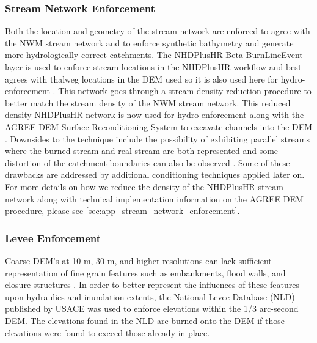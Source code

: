 \subsubsection{Stream Network Enforcement} 
\label{ssec:stream_network_enforcement}
%
Both the location and geometry of the stream network are enforced to agree with the NWM stream network and to enforce synthetic bathymetry and generate more hydrologically correct catchments.
The NHDPlusHR Beta BurnLineEvent layer is used to enforce stream locations in the NHDPlusHR workflow and best agrees with thalweg locations in the DEM used so it is also used here for hydro-enforcement \cite{moore2019user}. 
This network goes through a stream density reduction procedure to better match the stream density of the NWM stream network.
This reduced density NHDPlusHR network is now used for hydro-enforcement along with the AGREE DEM Surface Reconditioning System to excavate channels into the DEM \cite{hellweger1997agree}.
Downsides to the technique include the possibility of exhibiting parallel streams where the burned stream and real stream are both represented \cite{hellweger1997agree,saunders1999preparation} and some distortion of the catchment boundaries can also be observed \cite{saunders1999preparation,saunders1996gis}.
Some of these drawbacks are addressed by additional conditioning techniques applied later on.
For more details on how we reduce the density of the NHDPlusHR stream network along with technical implementation information on the AGREE DEM procedure, please see \ref{sec:app_stream_network_enforcement}.
%
\subsubsection{Levee Enforcement}
%
Coarse DEM's at 10 m, 30 m, and higher resolutions can lack sufficient representation of fine grain features such as embankments, flood walls, and closure structures \cite{arundel2018assimilation,dobbs2010evaluation,wang2005comparison,sanders2007evaluation}.
In order to better represent the influences of these features upon hydraulics and inundation extents, the National Levee Database (NLD) published by USACE was used to enforce elevations within the 1/3 arc-second DEM.
The elevations found in the NLD are burned onto the DEM if those elevations were found to exceed those already in place.
%
